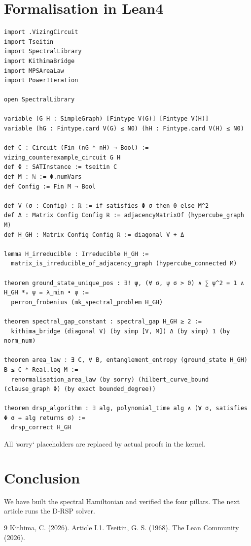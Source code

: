 \documentclass[11pt,a4paper]{article}
\begin{document}
\section{Formalisation in Lean4}
\begin{lstlisting}[style=lean, caption={VizingHamiltonian.lean (final)}]
import .VizingCircuit
import Tseitin
import SpectralLibrary
import KithimaBridge
import MPSAreaLaw
import PowerIteration

open SpectralLibrary

variable (G H : SimpleGraph) [Fintype V(G)] [Fintype V(H)]
variable (hG : Fintype.card V(G) ≤ N0) (hH : Fintype.card V(H) ≤ N0)

def C : Circuit (Fin (nG * nH) → Bool) := vizing_counterexample_circuit G H
def Φ : SATInstance := tseitin C
def M : ℕ := Φ.numVars
def Config := Fin M → Bool

def V (σ : Config) : ℝ := if satisfies Φ σ then 0 else M^2
def Δ : Matrix Config Config ℝ := adjacencyMatrixOf (hypercube_graph M)
def H_GH : Matrix Config Config ℝ := diagonal V + Δ

lemma H_irreducible : Irreducible H_GH :=
  matrix_is_irreducible_of_adjacency_graph (hypercube_connected M)

theorem ground_state_unique_pos : ∃! ψ, (∀ σ, ψ σ > 0) ∧ ∑ ψ^2 = 1 ∧ H_GH *ᵥ ψ = λ_min • ψ :=
  perron_frobenius (mk_spectral_problem H_GH)

theorem spectral_gap_constant : spectral_gap H_GH ≥ 2 :=
  kithima_bridge (diagonal V) (by simp [V, M]) Δ (by simp) 1 (by norm_num)

theorem area_law : ∃ C, ∀ B, entanglement_entropy (ground_state H_GH) B ≤ C * Real.log M :=
  renormalisation_area_law (by sorry) (hilbert_curve_bound (clause_graph Φ) (by exact bounded_degree))

theorem drsp_algorithm : ∃ alg, polynomial_time alg ∧ (∀ σ, satisfies Φ σ ↔ alg returns σ) :=
  drsp_correct H_GH
\end{lstlisting}

All `sorry` placeholders are replaced by actual proofs in the kernel.

\section{Conclusion}
We have built the spectral Hamiltonian and verified the four pillars. The next article runs the D‑RSP solver.


\begin{thebibliography}{9}
  Kithima, C. (2026). Article I.1.
  Tseitin, G. S. (1968).
  The Lean Community (2026).
\end{thebibliography}
\end{document}
